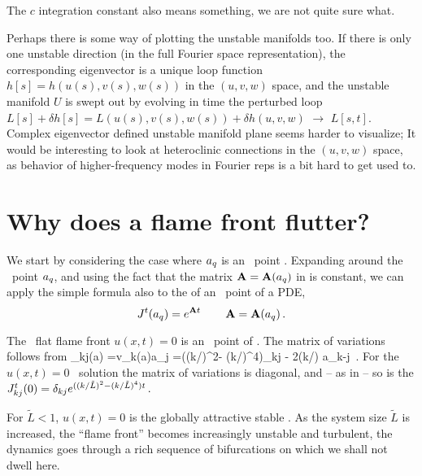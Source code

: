 The $c$ integration constant also means something, we are not quite sure
what.


Perhaps there is some way of plotting the unstable manifolds too. If
there is only one unstable direction (in the full Fourier space
representation), the corresponding eigenvector is a unique loop function
$h[s] =  h(u(s),v(s),w(s))$ in the $(u,v,w)$ space, and the unstable manifold
$U$ is swept out by evolving in time the perturbed loop 
$L[s] + \delta h[s] =  L(u(s),v(s),w(s)) + \delta h(u,v,w)$
$\to$ $L[s,t]$.
Complex eigenvector defined unstable manifold plane seems
harder to visualize;  It would be interesting
to look at heteroclinic connections in the $(u,v,w)$ space, as
behavior of higher-frequency modes in Fourier reps is a bit
hard to get used to.



\section{Why does a flame front flutter?}
\label{s:StabEqui}


We start by considering the case where
$a_q$ is an \eqv\ point . 
Expanding around the \eqv\ point $a_q$,
and using the fact that the matrix
${\bf {A}}={\bf {A}}(a_q)$
in 
is constant, 
we can apply the simple formula  also to the 
{\jacobianM}
of an \eqv\ point of a PDE, 
\[
 {J}^t(a_q) = e^{{\bf {A}} t}
    \,\qquad
 {\bf {A}}={\bf {A}}(a_q)
\,.
\]

The \KS\ flat flame front $u(x,t)=0$ is an 
\eqv\ point of . The matrix of variations
follows from 
\beq
{\Mvar}_{kj}(a) ={\pde v_k(a)\over \pde a_j  }
=((k/)^2- (k/)^4)\delta_{kj} - 2(k/) a_{k-j}
\,.
For the $u(x,t)=0$ \eqv\  solution the matrix of variations
is diagonal, and -- as in  -- so is the {\jacobianM}
$
{J}^t_{kj}(0) = \delta_{kj} e^{((k/\tilde{L})^2- (k/\tilde{L})^4)t}
\,.
$

For $\tilde{L} < 1$,  $u(x,t)=0$ is the globally attractive stable 
{\eqv}.
As the system size $\tilde{L}$  is increased,
the ``flame front'' becomes increasingly unstable and turbulent,
the dynamics goes through a rich sequence of
bifurcations on which we shall not dwell here.

